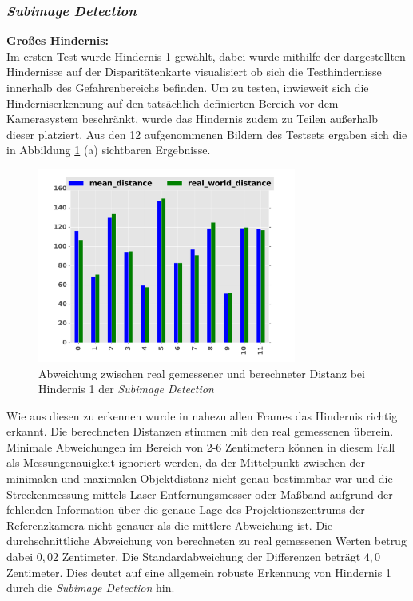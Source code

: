 \subsubsection{\emph{Subimage Detection}}
\label{sec:evaluierung_subimage}

\noindent
\textbf{Großes Hindernis:}\\ 
\noindent
Im ersten Test wurde Hindernis 1 gewählt, dabei wurde mithilfe der dargestellten Hindernisse auf der Disparitätenkarte visualisiert ob sich die Testhindernisse innerhalb des Gefahrenbereichs befinden. Um zu testen, inwieweit sich die Hinderniserkennung auf den tatsächlich definierten Bereich vor dem Kamerasystem beschränkt, wurde das Hindernis zudem zu Teilen außerhalb dieser platziert. Aus den 12 aufgenommenen Bildern des Testsets ergaben sich die in Abbildung \ref{fig:eval_big} (a) sichtbaren Ergebnisse.\\

\begin{figure}[h]
	\centering
	\includegraphics[width=8.5cm]{img/evaluation/diagrams/sub_big_bar}
	\caption{Abweichung zwischen real gemessener und berechneter Distanz bei Hindernis 1 der \emph{Subimage Detection}}
    \label{fig:eval_big}
\end{figure}

\noindent
Wie aus diesen zu erkennen wurde in nahezu allen Frames das Hindernis richtig erkannt. Die berechneten Distanzen stimmen mit den real gemessenen überein. Minimale Abweichungen im Bereich von 2-6 Zentimetern können in diesem Fall als Messungenauigkeit ignoriert werden, da der Mittelpunkt zwischen der minimalen und maximalen Objektdistanz nicht genau bestimmbar war und die Streckenmessung mittels Laser-Entfernungsmesser oder Maßband aufgrund der fehlenden Information über die genaue Lage des Projektionszentrums der Referenzkamera nicht genauer als die mittlere Abweichung ist. Die durchschnittliche Abweichung von berechneten zu real gemessenen Werten betrug dabei $0,02$ Zentimeter. Die Standardabweichung der Differenzen beträgt $4,0$ Zentimeter. Dies deutet auf eine allgemein robuste Erkennung von Hindernis 1 durch die \emph{Subimage Detection} hin.

